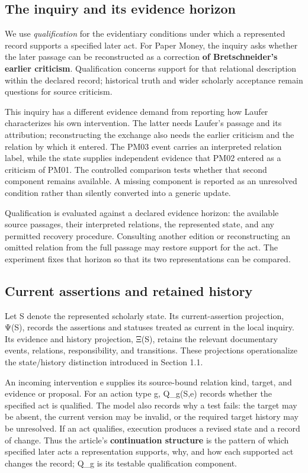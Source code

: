 \documentclass[11pt,a4paper]{article}
\begin{document}
\subsection{The inquiry and its evidence horizon}

We use \emph{qualification} for the evidentiary conditions under which a represented record supports a specified later act. For Paper Money, the inquiry asks whether the later passage can be reconstructed as a correction \textbf{of Bretschneider's earlier criticism}. Qualification concerns support for that relational description within the declared record; historical truth and wider scholarly acceptance remain questions for source criticism.


This inquiry has a different evidence demand from reporting how Laufer characterizes his own intervention. The latter needs Laufer's passage and its attribution; reconstructing the exchange also needs the earlier criticism and the relation by which it entered. The PM03 event carries an interpreted relation label, while the state supplies independent evidence that PM02 entered as a criticism of PM01. The controlled comparison tests whether that second component remains available. A missing component is reported as an unresolved condition rather than silently converted into a generic update.


Qualification is evaluated against a declared evidence horizon: the available source passages, their interpreted relations, the represented state, and any permitted recovery procedure. Consulting another edition or reconstructing an omitted relation from the full passage may restore support for the act. The experiment fixes that horizon so that its two representations can be compared.


\subsection{Current assertions and retained history}

Let S denote the represented scholarly state. Its current-assertion projection, Ψ(S), records the assertions and statuses treated as current in the local inquiry. Its evidence and history projection, Ξ(S), retains the relevant documentary events, relations, responsibility, and transitions. These projections operationalize the state/history distinction introduced in Section 1.1.


An incoming intervention e supplies its source-bound relation kind, target, and evidence or proposal. For an action type g, Q\_g(S,e) records whether the specified act is qualified. The model also records why a test fails: the target may be absent, the current version may be invalid, or the required target history may be unresolved. If an act qualifies, execution produces a revised state and a record of change. Thus the article's \textbf{continuation structure} is the pattern of which specified later acts a representation supports, why, and how each supported act changes the record; Q\_g is its testable qualification component.
\end{document}
